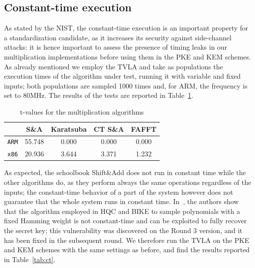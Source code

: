 \documentclass[11pt,a4paper,twocolumn]{article}
\theoremstyle{definition}
\begin{document}
\subsection{Constant-time execution}
As stated by the NIST, the constant-time execution is an important property for a standardization candidate, as it increases
its security against side-channel attacks: it is hence important to assess the presence of timing leaks in our multiplication implementations
before using them in the PKE and KEM schemes. As already mentioned we employ the TVLA and take as populations the execution times
of the algorithm under test, running it with variable and fixed inputs; both populations are sampled 1000 times and, for ARM,
the frequency is set to 80MHz. The results of the tests are reported in Table~\ref{tab:ctmult}.
\begin{table}\small
    \centering
    \caption{t-values for the multiplication algorithms}
    \begin{tabular}{c|cccc}
        \toprule
        & \textbf{S\&A} & \textbf{Karatsuba} & \textbf{CT S\&A} & \textbf{FAFFT} \\
        \midrule
        \texttt{ARM} & 55.748 & 0.000 & 0.000 & 0.000 \\
        \texttt{x86} & 20.936 & 3.644 & 3.371 & 1.232\\
        \bottomrule
    \end{tabular}
    \label{tab:ctmult}
\end{table}

As expected, the schoolbook Shift\&Add does not run in constant time while the other algorithms do, as they perform always the same
operations regardless of the inputs; the constant-time behavior of a part of the system however does not guarantee that the whole
system runs in constant time. In~\cite{DBLP:journals/tches/GuoHJLNS22}, the authors show that the algorithm employed in HQC and BIKE to sample polynomials
with a fixed Hamming weight is not constant-time and can be exploited to fully recover the secret key; this vulnerability was discovered
on the Round 3 version, and it has been fixed in the subsequent round. We therefore run the TVLA on the PKE and KEM schemes with
the same settings as before, and find the results reported in Table~\ref{tab:ct}.
\end{document}
